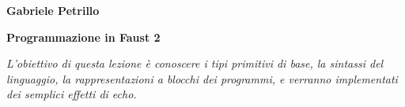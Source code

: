 \documentclass[11pt]{article}
\begin{document}
\begin{minipage}{0.55\linewidth}
\vspace{0.3cm}
\large{\textbf{Gabriele Petrillo}}\\
\end{minipage}

\vspace{0.3cm}
\begin{minipage}{0.95\linewidth}
\begin{center}
\huge{\textbf{Programmazione in Faust 2}} \\
\end{center}
\end{minipage}
\vspace*{0.2cm}


\begin{center}
\begin{minipage}[c]{14cm}


\textit{L'obiettivo di questa lezione è conoscere i tipi primitivi di base, la sintassi del linguaggio, la rappresentazioni a blocchi dei programmi, e verranno implementati dei semplici effetti di echo.}

\end{minipage}
\end{center}
\vspace*{0.2cm}

\setlength{\columnsep}{3em}
\end{document}
